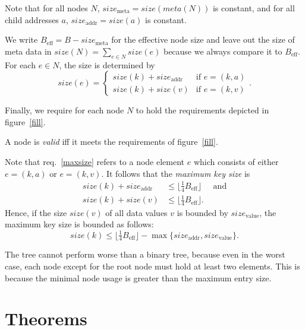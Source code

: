 \documentclass{vldb}
\newcommand \Beff { B_{\text{eff}} }
\begin{document}
\begin{defi}
Note that for all nodes $N$, $size_\text{meta} = size(meta(N))$ is constant,
and for all child addresses $a$, $size_\text{addr} = size(a)$ is constant.

We write $\Beff = B - size_\text{meta}$ for the effective node size and leave
out the size of meta data in $size(N) = \sum_{e \in N} size(e)$ because we
always compare it to $\Beff$.
For each $e \in N$, the size is determined by
\[ size(e) = \begin{cases}
size(k) + size_\text{addr} & \text{if } e = (k,a)\\
size(k) + size(v)          & \text{if } e = (k,v)
\end{cases}. \]

Finally, we require for each node $N$ to hold the requirements depicted in
figure~\ref{fill}.
\end{defi}


\begin{defi}
A node is {\em valid} iff it meets the requirements of figure~\ref{fill}.
\end{defi}


\begin{rem}
Note that req.~\ref{maxsize} refers to a node element $e$ which consists
of either \mbox{$e = (k, a)$} or \mbox{$e = (k, v)$}.
It follows that the {\em maximum key size} is
\begin{align*}
size(k) + size_\text{addr}
    &\leq \lfloor \tfrac{1}{4} \Beff \rfloor & \text{ and}\\
size(k) + size(v)
    &\leq \lfloor \tfrac{1}{4} \Beff \rfloor.
\end{align*}
Hence, if the size $size(v)$ of all data values $v$ is bounded by
$size_\text{value}$, the maximum key size is bounded as follows:
\[ size(k) \leq \lfloor \tfrac{1}{4} \Beff \rfloor 
    - \max \{ size_\text{addr}, size_\text{value} \}. \]
\end{rem}


\begin{rem}
The tree cannot perform worse than a binary tree, because even in the worst
case, each node except for the root node must hold at least two elements.
This is because the minimal node usage is greater than the maximum entry size.
\end{rem}



\section{Theorems} %
\end{document}
